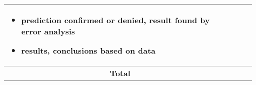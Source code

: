 \documentclass[
    8pt,
    DIV=42,
    BCOR=0mm,
    pagenumber=off,
    paper=5.5in:8.5in,
    pagesize,
]{scrartcl}
\begin{document}
\begin{tabularx}{\textwidth}{|X|X|m{0.557in}|c|}
\begin{itemize}[leftmargin=*]
                                                                                  \item{prediction confirmed or denied, result found by error analysis}
                                                                                  \item{results, conclusions based on data}
                                                                                 \end{itemize}                                                                    &                          &                        \\ \hline 
 \multicolumn{2}{|c|}{\textbf{Total}}                                                                                                                             & \null\null               &                        \\ \hline
\end{tabularx}
\vfill
                  
\end{document}
